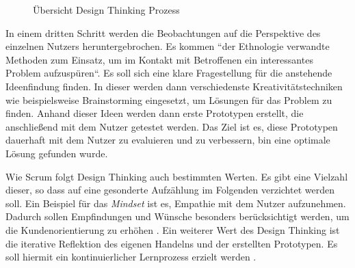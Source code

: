 \begin{figure}[H]
	\centering
	\caption[Übersicht Design Thinking Prozess]{Übersicht Design Thinking Prozess \protect \footnotemark}
	\label{fig:designthinking}
\end{figure}

In einem dritten Schritt werden die Beobachtungen auf die Perspektive des einzelnen Nutzers heruntergebrochen. Es kommen ``der Ethnologie verwandte Methoden zum Einsatz, um im Kontakt mit Betroffenen ein interessantes Problem aufzuspüren``\cite[S. 3]{meinel_design_2016}. Es soll sich eine klare Fragestellung für die anstehende Ideenfindung finden. In dieser werden dann verschiedenste Kreativitätstechniken wie beispielsweise Brainstorming eingesetzt, um Lösungen für das Problem zu finden. Anhand dieser Ideen werden dann erste Prototypen erstellt, die anschließend mit dem Nutzer getestet werden. Das Ziel ist es, diese Prototypen dauerhaft mit dem Nutzer zu evaluieren und zu verbessern, bin eine optimale Lösung gefunden wurde.

Wie Scrum folgt Design Thinking auch bestimmten Werten. Es gibt eine Vielzahl dieser, so dass auf eine gesonderte Aufzählung im Folgenden verzichtet werden soll. Ein Beispiel für das \textit{Mindset} ist es, Empathie mit dem Nutzer aufzunehmen. Dadurch sollen Empfindungen und Wünsche besonders berücksichtigt werden, um die Kundenorientierung zu erhöhen \cite[S. 3]{lewrick_design_2018}. Ein weiterer Wert des Design Thinking ist die iterative Reflektion des eigenen Handelns und der erstellten Prototypen. Es soll hiermit ein kontinuierlicher Lernprozess erzielt werden \cite[S. 3]{lewrick_design_2018}. 

